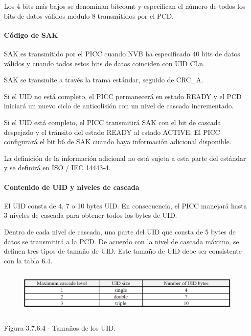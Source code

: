 Los 4 bits más bajos se denominan bitcount y especifican el número de todos los bits de datos válidos módulo 8 transmitidos por el PCD.\par

\paragraph{Código de SAK}
SAK es transmitido por el PICC cuando NVB ha especificado 40 bits de datos válidos y cuando todos estos bits de datos coinciden con UID CLn.\par

SAK se transmite a través la trama estándar, seguido de CRC\_A.\par

Si el UID no está completo, el PICC permanecerá en estado READY y el PCD iniciará un nuevo ciclo de anticolisión con un nivel de cascada incrementado.\par

Si el UID está completo, el PICC transmitirá SAK con el bit de cascada despejado y el tránsito del estado READY al estado ACTIVE. El PICC configurará el bit b6 de SAK cuando haya información adicional disponible.\par

La definición de la información adicional no está sujeta a esta parte del estándar y se definirá en ISO / IEC 14443-4.\par

\paragraph{Contenido de UID y niveles de cascada}
El UID consta de 4, 7 o 10 bytes UID. En consecuencia, el PICC manejará hasta 3 niveles de cascada para obtener todos los bytes de UID.\par

Dentro de cada nivel de cascada, una parte del UID que consta de 5 bytes de datos se transmitirá a la PCD. De acuerdo con la nivel de cascada máximo, se definen tres tipos de tamaño de UID. Este tamaño de UID debe ser consistente con la tabla 6.4.\par




\begin{figure}[H]
	\begin{center}
		\includegraphics[width=6.27in,height=0.89in]{Norma_ISO/14443-3/media/image8.png}
        \end{center}
\end{figure}



\par
\begin{center}
Figura 3.7.6.4 - Tamaños de los UID.
\end{center}
\par
